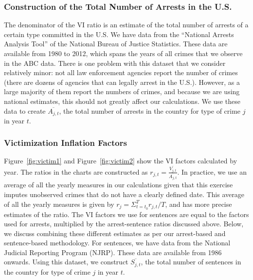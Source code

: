 \subsubsection{Construction of the Total Number of Arrests in the U.S.}
\noindent The denominator of the VI ratio is an estimate of the total number of arrests of a certain type committed in the U.S. We have data from the ``National Arrests Analysis Tool'' of the National Bureau of Justice Statistics. These data are available from 1980 to 2012, which spans the years of all crimes that we observe in the ABC data. There is one problem with this dataset that we consider relatively minor: not all law enforcement agencies report the number of crimes (there are dozens of agencies that can legally arrest in the U.S.). However, as a large majority of them report the numbers of crimes, and because we are using national estimates, this should not greatly affect our calculations. We use these data to create $\overline{A_{j,t}}$, the total number of arrests in the country for type of crime $j$ in year $t$.

\subsubsection{Victimization Inflation Factors}

\noindent Figure~\ref{fig:victim1} and Figure~\ref{fig:victim2} show the VI factors calculated by year. The ratios in the charts are constructed as $r_{j,t}=\frac{\overline{V_{j,t}}}{\overline{A_{j,t}}}$. In practice, we use an average of all the yearly measures in our calculations given that this exercise imputes unobserved crimes that do not have a clearly defined date. This average of all the yearly measures is given by $r_j=\Sigma_{t=t_0}^{T}r_{j,t}/T$, and has more precise estimates of the ratio. The VI factors we use for sentences are equal to the factors used for arrests, multiplied by the arrest-sentence ratios discussed above. Below, we discuss combining these different estimates as per our arrest-based and sentence-based methodology. For sentences, we have data from the National Judicial Reporting Program (NJRP). These data are available from 1986 onwards. Using this dataset, we construct $\overline{S_{j,t}}$, the total number of sentences in the country for type of crime $j$ in year $t$.

